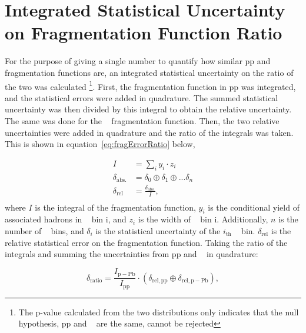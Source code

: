 





% 

\section{Integrated Statistical Uncertainty on Fragmentation Function Ratio}
For the purpose of giving a single number to quantify how similar pp and \pPb~ fragmentation functions are, an integrated statistical uncertainty on the ratio of the two was calculated \footnote{The p-value calculated from the two distributions only indicates that the null hypothesis, pp and \pPb~ are the same, cannot be rejected}. First, the fragmentation function in pp was integrated, and the statistical errors were added in quadrature. The summed statistical uncertainty was then divided by this integral to obtain the relative uncertainty. The same was done for the \pPb~ fragmentation function. Then, the two relative uncertainties were added in quadrature and the ratio of the integrals was taken. This is shown in equation~\ref{eq:fragErrorRatio} below,

\begin{equation}\label{eq:fragErrorRatio}
  \begin{split}
    I &= \sum_i y_i\cdot z_i \\
    \delta_\mathrm{abs.} &= \delta_0 \oplus \delta_1 \oplus ...\delta_n\\
    \delta_\mathrm{rel} &= \frac{\delta_\mathrm{abs.}}{I},\\
  \end{split}
\end{equation}{}
where $I$ is the integral of the fragmentation function, $y_i$ is the conditional yield of associated hadrons in \zt~ bin i, and $z_i$ is the width of \zt~ bin i. Additionally, $n$ is the number of \zt~ bins, and $\delta_i$ is the statistical uncertainty of the $i_\mathrm{th}$ \zt~ bin. $\delta_\mathrm{rel}$ is the relative statistical error on the fragmentation function. Taking the ratio of the integrals and summing the uncertainties from pp and \pPb~ in quadrature:

\begin{equation}
  \delta_\mathrm{ratio} = \frac{I_\mathrm{p-Pb}}{I_\mathrm{pp}}\cdot (\delta_\mathrm{rel,pp} \oplus \delta_\mathrm{rel,p-Pb}),
\end{equation}

